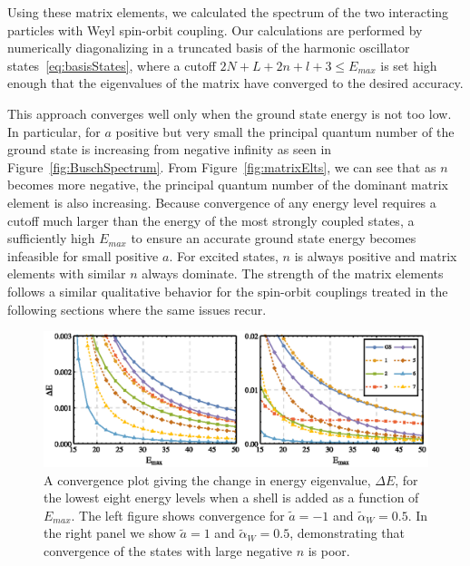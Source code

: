 \documentclass[%
 onecolumn,
 notitlepage,
 amsmath,amssymb,
 aps,
]{revtex4-1}
\begin{document}
Using these matrix elements, we calculated the spectrum of the two interacting particles with Weyl spin-orbit coupling. Our calculations are performed by numerically diagonalizing in a truncated basis of the harmonic oscillator states~\eqref{eq:basisStates}, where a cutoff $2N+L+2n+l+3\leq E_{max}$ is set high enough that the eigenvalues of the matrix have converged to the desired accuracy.  

This approach converges well only when the ground state energy is not too low. In particular, for $a$ positive but very small the principal quantum number of the ground state is increasing from negative infinity as seen in Figure~\ref{fig:BuschSpectrum}. From Figure~\ref{fig:matrixElts}, we can see that as $n$ becomes more negative, the principal quantum number of the dominant matrix element is also increasing. Because convergence of any energy level requires a cutoff much larger than the energy of the most strongly coupled states, a sufficiently high $E_{max}$ to ensure an accurate ground state energy becomes infeasible for small positive $a$. For excited states, $n$ is always positive and matrix elements with similar $n$ always dominate. The strength of the matrix elements follows a similar qualitative behavior for the spin-orbit couplings treated in the following sections where the same issues recur. 

\begin{figure}
\includegraphics{Figures/WeylConvergence}
\caption{\label{fig:WeylConvergence} A convergence plot giving the change in energy eigenvalue, $\Delta E$, for the lowest eight energy levels when a shell is added as a function of $E_{max}$.  The left figure shows convergence for $\tilde{a}=-1$ and $\tilde{\alpha}_W=0.5$. In the right panel  we show $\tilde{a}=1$ and $\tilde{\alpha}_W=0.5$, demonstrating that convergence of the states with large negative $n$ is poor.} 
\end{figure}
\end{document}
